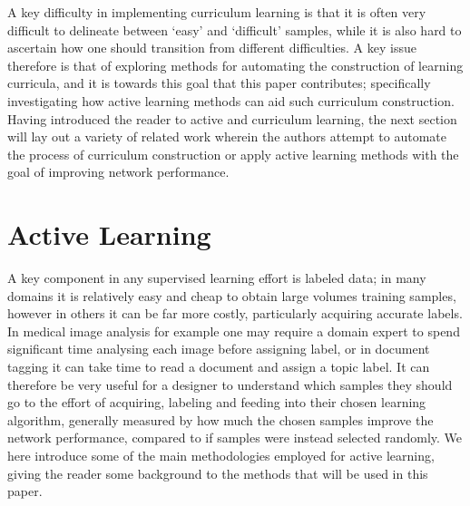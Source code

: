 A key difficulty in implementing curriculum learning is that it is often very difficult to delineate between `easy' and `difficult' samples, while it is also hard to ascertain how one should transition from different difficulties. A key issue therefore is that of exploring methods for  automating the construction of learning curricula, and it is towards this goal that this paper contributes; specifically investigating how active learning methods can aid such curriculum construction. Having introduced the reader to active and curriculum learning, the next section will lay out a variety of related work wherein the authors attempt to automate the process of curriculum construction or apply active learning methods with the goal of improving network performance. 


\section{Active Learning}\label{Background_ActiveLearning}
A key component in any supervised learning effort is labeled data; in many domains it is relatively easy and cheap to obtain large volumes training samples, however in others it can be far more costly, particularly acquiring accurate labels. In medical image analysis for example one may require a domain expert to spend significant time analysing each image before assigning label, or in document tagging it can take time to read a document and assign a topic label. It can therefore be very useful for a designer to understand which samples they should go to the effort of acquiring, labeling and feeding into their chosen learning algorithm, generally measured by how much the chosen samples improve the network performance, compared to if samples were instead selected randomly. We here introduce some of the main methodologies employed for active learning, giving the reader some background to the methods that will be used in this paper.

